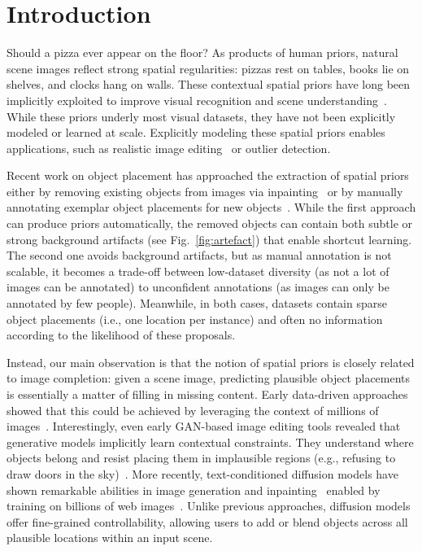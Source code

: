 

\section{Introduction}

Should a pizza ever appear on the floor? As products of human priors, natural scene images reflect strong spatial regularities: pizzas rest on tables, books lie on shelves, and clocks hang on walls. These contextual spatial priors have long been implicitly exploited to improve visual recognition and scene understanding~\cite{torralba2003context,rabinovich2007objects,galleguillos2008object,doersch2015unsupervised}. While these priors underly most visual datasets, they have not been explicitly modeled or learned at scale. Explicitly modeling these spatial priors enables applications, such as realistic image editing~\cite{schouten2025poempreciseobjectlevelediting,chen2026referring} or outlier detection.

Recent work on object placement has approached the extraction of spatial priors either by removing existing objects from images via inpainting~\cite{wasserman2024paint,parihar2024text2place,winter2025objectmate} or by manually annotating exemplar object placements for new objects~\cite{liu2021opa,li2023dreamedit}. While the first approach can produce priors automatically, the removed objects can contain both subtle or strong background artifacts (see Fig.~\ref{fig:artefact}) that enable shortcut learning. The second one avoids background artifacts, but as manual annotation is not scalable, it becomes a trade-off between low-dataset diversity (as not a lot of images can be annotated) to unconfident annotations (as images can only be annotated by few people). Meanwhile, in both cases, datasets contain sparse object placements (i.e., one location per instance) and often no information according to the likelihood of these proposals.


Instead, our main observation is that the notion of spatial priors is closely related to image completion: given a scene image, predicting plausible object placements is essentially a matter of filling in missing content. Early data-driven approaches showed that this could be achieved by leveraging the context of millions of images~\cite{hays2007scene}. Interestingly, even early GAN-based image editing tools revealed that generative models implicitly learn contextual constraints. They understand where objects belong and resist placing them in implausible regions (e.g., refusing to draw doors in the sky)~\cite{bau2018gan,bau2020units}. 
More recently, text-conditioned diffusion models have shown remarkable abilities in image generation and inpainting~\cite{rombach2021highresolution, ramesh2022hierarchical, zhang2023adding} enabled by training on billions of web images~\cite{schuhmann2022laion}. Unlike previous approaches, diffusion models offer fine-grained controllability, allowing users to add or blend objects across all plausible locations within an input scene.

